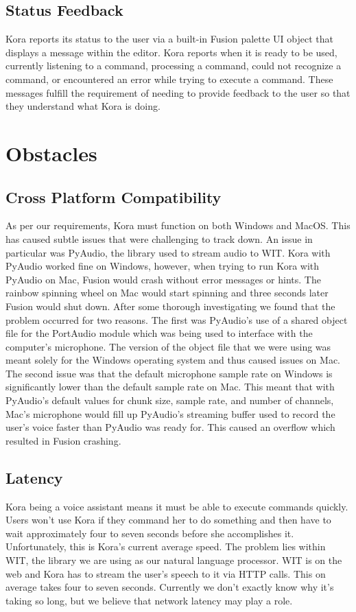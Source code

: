 \documentclass[onecolumn, draftclsnofoot,10pt, compsoc]{IEEEtran}
\begin{document}
	\subsection{Status Feedback}
		Kora reports its status to the user via a built-in Fusion palette UI object that displays a message within the editor.
		Kora reports when it is ready to be used, currently listening to a command, processing a command, could not recognize a command, or encountered an error while trying to execute a command.
		These messages fulfill the requirement of needing to provide feedback to the user so that they understand what Kora is doing.

\section{Obstacles}
	\subsection{Cross Platform Compatibility}
		As per our requirements, Kora must function on both Windows and MacOS.
		This has caused subtle issues that were challenging to track down.
		An issue in particular was PyAudio, the library used to stream audio to WIT.
		Kora with PyAudio worked fine on Windows, however, when trying to run Kora with PyAudio on Mac, Fusion would crash without error messages or hints.
		The rainbow spinning wheel on Mac would start spinning and three seconds later Fusion would shut down.
		After some thorough investigating we found that the problem occurred for two reasons.
		The first was PyAudio's use of a shared object file for the PortAudio module which was being used to interface with the computer's microphone.
		The version of the object file that we were using was meant solely for the Windows operating system and thus caused issues on Mac.
		The second issue was that the default microphone sample rate on Windows is significantly lower than the default sample rate on Mac.
		This meant that with PyAudio's default values for chunk size, sample rate, and number of channels, Mac's microphone would fill up PyAudio's streaming buffer used to record the user's voice faster than PyAudio was ready for.
		This caused an overflow which resulted in Fusion crashing.
	
	\subsection{Latency}
		Kora being a voice assistant means it must be able to execute commands quickly.
		Users won't use Kora if they command her to do something and then have to wait approximately four to seven  seconds before she accomplishes it.
		Unfortunately, this is Kora's current average speed.
		The problem lies within WIT, the library we are using as our natural language processor.
		WIT is on the web and Kora has to stream the user's speech to it via HTTP calls.
		This on average takes four to seven seconds.
		Currently we don't exactly know why it's taking so long, but we believe that network latency may play a role.
		
\end{document}
